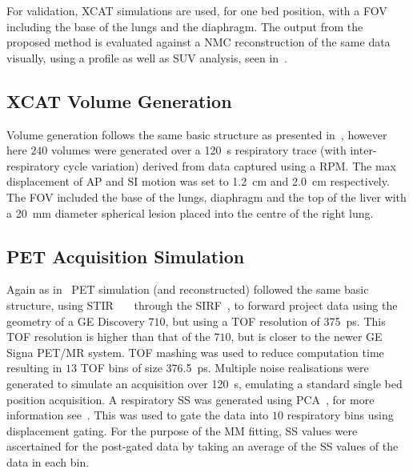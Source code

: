             For validation, \gls{XCAT} simulations are used, for one bed position, with a \gls{FOV} including the base of the lungs and the diaphragm. The output from the proposed method is evaluated against a \gls{NMC} reconstruction of the same data visually, using a profile as well as \gls{SUV} analysis, seen in~.
            
            \subsection{XCAT Volume Generation} \label{sec:pet_ct_respiratory_motion_correction_with_a_single_attenuation_map_using_nac_derived_deformation_fields_methods_xcat_volume_generation}
                Volume generation follows the same basic structure as presented in~, however here $240$ volumes were generated over a \SI{120}{\second} respiratory trace (with inter-respiratory cycle variation) derived from data captured using a \gls{RPM}. The max displacement of \gls{AP} and \gls{SI} motion was set to \SI{1.2}{\centi\metre} and \SI{2.0}{\centi\metre} respectively. The \gls{FOV} included the base of the lungs, diaphragm and the top of the liver with a \SI{20}{\milli\metre} diameter spherical lesion placed into the centre of the right lung.
    
            \subsection{PET Acquisition Simulation} \label{sec:pet_ct_respiratory_motion_correction_with_a_single_attenuation_map_using_nac_derived_deformation_fields_methods_pet_acquisition_simulation}
                Again as in~ \gls{PET} simulation (and reconstructed) followed the same basic structure, using \gls{STIR}~\parencite{Thielemans2012}~\parencite{Nikos2019}~\parencite{Wadhwa2020PETLibrary} through the \gls{SIRF}~\parencite{Ovtchinnikov2017}, to forward project data using the geometry of a \gls{GE} Discovery $710$, but using a \gls{TOF} resolution of \SI{375}{\pico\second}. This \gls{TOF} resolution is higher than that of the $710$, but is closer to the newer \gls{GE} Signa \gls{PET}/\gls{MR} system. \gls{TOF} mashing was used to reduce computation time resulting in $13$ \gls{TOF} bins of size \SI{376.5}{\pico\second}. Multiple noise realisations were generated to simulate an acquisition over \SI{120}{\second}, emulating a standard single bed position acquisition. A respiratory \gls{SS} was generated using \gls{PCA}~\parencite{Thielemans2011}, for more information see~. This was used to gate the data into $10$ respiratory bins using displacement gating. For the purpose of the \gls{MM} fitting, \gls{SS} values were ascertained for the post-gated data by taking an average of the \gls{SS} values of the data in each bin.
            
